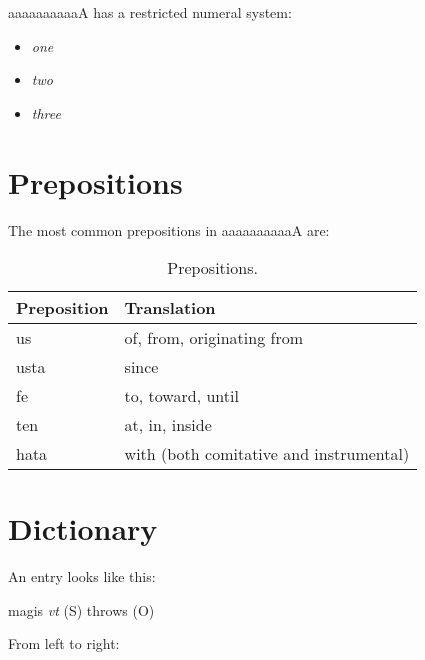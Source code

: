 \documentclass{book}
\newcommand{\lname}{aaaaaaaaaaA}
\begin{document}
\lname{} has a restricted numeral system:

\begin{itemize}
  \item {} \emph{one}
  \item {} \emph{two}
  \item {} \emph{three}
\end{itemize}

\chapter{Prepositions}

The most common prepositions in \lname{} are:

\begin{table}[ht]
  \caption{Prepositions.}
  \centering
  \begin{tabu} to \linewidth {l|Y}
    Preposition & Translation \\
    \hline
    us & of, from, originating from \\
    usta & since \\
    fe & to, toward, until \\
    ten & at, in, inside \\
    hata & with (both comitative and instrumental) \\
  \end{tabu}
\end{table}

\appendix

\chapter{Dictionary}

An entry looks like this:

\textsf{magis} \textit{vt}
\quad (S) throws (O)

From left to right:
\end{document}
